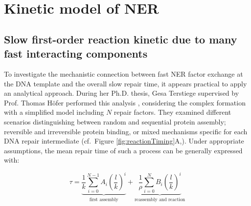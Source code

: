 \section{Kinetic model of NER}
\subsection{Slow first-order reaction kinetic due to many fast interacting components}
\label{sec:toyModel}
To investigate the mechanistic connection between fast NER factor exchange at the DNA template and the overall slow repair time, it appears practical to apply an analytical approach. During her Ph.D. thesis, Gesa Terstiege supervised by Prof. Thomas H\"ofer performed this analysis \cite{Terstiege2010,Verbruggen2014}, considering the complex formation with a simplified model including $N$ repair factors. They examined different scenarios distinguishing between random and sequential protein assembly; reversible and irreversible protein binding, or mixed mechanisms specific for each DNA repair intermediate (cf.\ Figure \ref{fig:reactionTiming}A,\cite{Verbruggen2014}). Under appropriate assumptions, the mean repair time of such a process can be generally expressed with:

\begin{equation}
\tau = \underbrace{\frac{1}{k}\sum^{N-1}_{i=0}A_i\left(\frac{l}{k}\right)^i}_{\text{first assembly}} +  \underbrace{\frac{1}{\rho}\sum_{i=0}^{N}B_i \left(\frac{l}{k}\right)^i}_{\text{reassembly and reaction}} \label{Eqn:taugen}
\end{equation}

